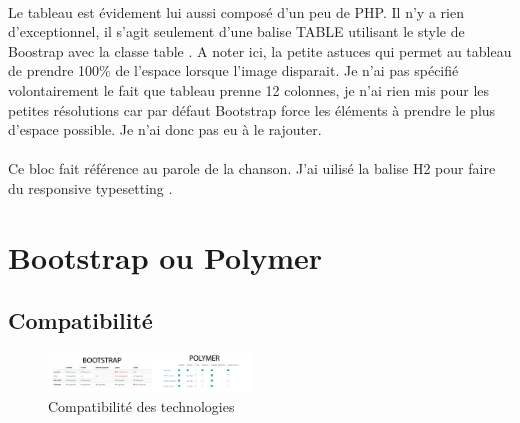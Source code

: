 \documentclass{article}
\begin{document}
\vspace{0.5cm}\\
Le tableau est \'evidement lui aussi compos\'e d'un peu de PHP. Il n'y a rien d'exceptionnel, il s'agit seulement d'une balise TABLE utilisant le style de Boostrap avec la classe \og table \fg{}. A noter ici, la petite astuces qui permet au tableau de prendre 100\% de l'espace lorsque l'image disparait. Je n'ai pas sp\'ecifi\'e volontairement le fait que tableau prenne 12 colonnes, je n'ai rien mis pour les petites r\'esolutions car par d\'efaut Bootstrap force les \'el\'ements \`a prendre le plus d'espace possible. Je n'ai donc pas eu \`a le rajouter. 
\vspace{0.5cm}\\
\vspace{0.5cm}\\
Ce bloc fait r\'ef\'erence au parole de la chanson. J'ai uilis\'e la balise H2 pour faire du \og responsive typesetting \fg{}.





\newpage
\section{Bootstrap ou Polymer}

\subsection{Compatibilit\'e}

\begin{figure}
  \vspace{-25pt}
  \begin{center}
    \includegraphics[width=0.48\textwidth]{p14}
  \end{center}
  \vspace{-20pt}
  \caption{Compatibilit\'e des technologies}
  \vspace{-10pt}
\end{figure}
\end{document}
